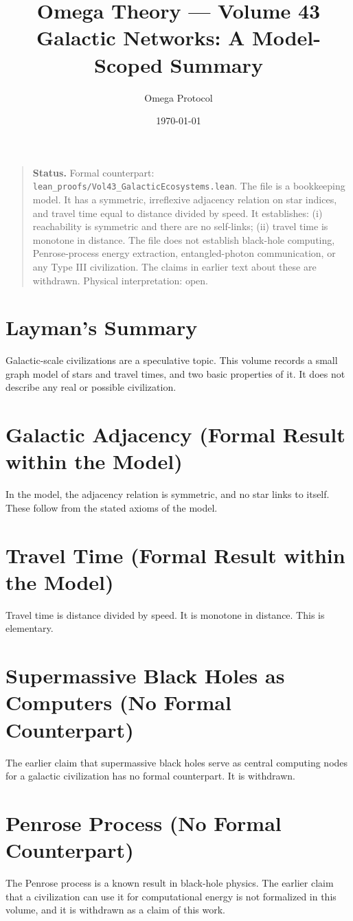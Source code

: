 \documentclass[11pt, a4paper]{article}
\title{Omega Theory --- Volume 43\\\Large Galactic Networks: A Model-Scoped Summary}
\author{Omega Protocol}
\date{\today}
\begin{document}
\maketitle

\begin{quote}
\textbf{Status.} Formal counterpart: \texttt{lean\_proofs/Vol43\_GalacticEcosystems.lean}. The file is a bookkeeping model. It has a symmetric, irreflexive adjacency relation on star indices, and travel time equal to distance divided by speed. It establishes: (i) reachability is symmetric and there are no self-links; (ii) travel time is monotone in distance. The file does not establish black-hole computing, Penrose-process energy extraction, entangled-photon communication, or any Type III civilization. The claims in earlier text about these are withdrawn. Physical interpretation: open.
\end{quote}

\section*{Layman's Summary}
Galactic-scale civilizations are a speculative topic. This volume records a small graph model of stars and travel times, and two basic properties of it. It does not describe any real or possible civilization.

\section{Galactic Adjacency (Formal Result within the Model)}
In the model, the adjacency relation is symmetric, and no star links to itself. These follow from the stated axioms of the model.

\section{Travel Time (Formal Result within the Model)}
Travel time is distance divided by speed. It is monotone in distance. This is elementary.

\section{Supermassive Black Holes as Computers (No Formal Counterpart)}
The earlier claim that supermassive black holes serve as central computing nodes for a galactic civilization has no formal counterpart. It is withdrawn.

\section{Penrose Process (No Formal Counterpart)}
The Penrose process is a known result in black-hole physics. The earlier claim that a civilization can use it for computational energy is not formalized in this volume, and it is withdrawn as a claim of this work.
\end{document}
